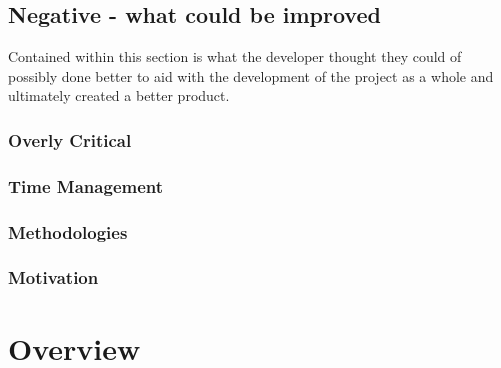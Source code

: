 \subsection{Negative - what could be improved}

Contained within this section is what the developer thought they could of possibly done better to aid with the development of the project as a whole and ultimately created a better product. 

\subsubsection{Overly Critical}

\subsubsection{Time Management}

\subsubsection{Methodologies}

\subsubsection{Motivation}


\section{Overview}

